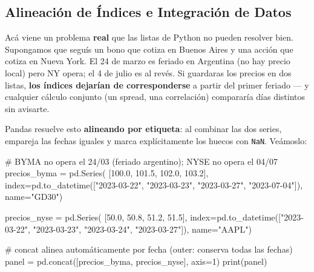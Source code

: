 \documentclass[
  spanish,
  letterpaper,
  DIV=11,
  numbers=noendperiod]{scrreprt}
\newenvironment{Shaded}{\begin{snugshade}}{\end{snugshade}}
\newcommand{\BuiltInTok}[1]{\textcolor[rgb]{0.00,0.23,0.31}{#1}}
\newcommand{\CommentTok}[1]{\textcolor[rgb]{0.37,0.37,0.37}{#1}}
\newcommand{\DecValTok}[1]{\textcolor[rgb]{0.68,0.00,0.00}{#1}}
\newcommand{\FloatTok}[1]{\textcolor[rgb]{0.68,0.00,0.00}{#1}}
\newcommand{\NormalTok}[1]{\textcolor[rgb]{0.00,0.23,0.31}{#1}}
\newcommand{\OperatorTok}[1]{\textcolor[rgb]{0.37,0.37,0.37}{#1}}
\newcommand{\StringTok}[1]{\textcolor[rgb]{0.13,0.47,0.30}{#1}}
\begin{document}
\subsection{Alineación de Índices e Integración de
Datos}\label{alineaciuxf3n-de-uxedndices-e-integraciuxf3n-de-datos}

Acá viene un problema \textbf{real} que las listas de Python no pueden
resolver bien. Supongamos que seguís un bono que cotiza en Buenos Aires
y una acción que cotiza en Nueva York. El 24 de marzo es feriado en
Argentina (no hay precio local) pero NY opera; el 4 de julio es al
revés. Si guardaras los precios en dos listas, \textbf{los índices
dejarían de corresponderse} a partir del primer feriado --- y cualquier
cálculo conjunto (un spread, una correlación) compararía días distintos
sin avisarte.

Pandas resuelve esto \textbf{alineando por etiqueta}: al combinar las
dos series, empareja las fechas iguales y marca explícitamente los
huecos con \texttt{NaN}. Veámoslo:

\label{alineacion-fechas}
\begin{Shaded}
\begin{Highlighting}[]
\CommentTok{\# BYMA no opera el 24/03 (feriado argentino); NYSE no opera el 04/07}
\NormalTok{precios\_byma }\OperatorTok{=}\NormalTok{ pd.Series(}
\NormalTok{    [}\FloatTok{100.0}\NormalTok{, }\FloatTok{101.5}\NormalTok{, }\FloatTok{102.0}\NormalTok{, }\FloatTok{103.2}\NormalTok{],}
\NormalTok{    index}\OperatorTok{=}\NormalTok{pd.to\_datetime([}\StringTok{"2023{-}03{-}22"}\NormalTok{, }\StringTok{"2023{-}03{-}23"}\NormalTok{, }\StringTok{"2023{-}03{-}27"}\NormalTok{, }\StringTok{"2023{-}07{-}04"}\NormalTok{]),}
\NormalTok{    name}\OperatorTok{=}\StringTok{"GD30"}\NormalTok{)}

\NormalTok{precios\_nyse }\OperatorTok{=}\NormalTok{ pd.Series(}
\NormalTok{    [}\FloatTok{50.0}\NormalTok{, }\FloatTok{50.8}\NormalTok{, }\FloatTok{51.2}\NormalTok{, }\FloatTok{51.5}\NormalTok{],}
\NormalTok{    index}\OperatorTok{=}\NormalTok{pd.to\_datetime([}\StringTok{"2023{-}03{-}22"}\NormalTok{, }\StringTok{"2023{-}03{-}23"}\NormalTok{, }\StringTok{"2023{-}03{-}24"}\NormalTok{, }\StringTok{"2023{-}03{-}27"}\NormalTok{]),}
\NormalTok{    name}\OperatorTok{=}\StringTok{"AAPL"}\NormalTok{)}

\CommentTok{\# concat alinea automáticamente por fecha (outer: conserva todas las fechas)}
\NormalTok{panel }\OperatorTok{=}\NormalTok{ pd.concat([precios\_byma, precios\_nyse], axis}\OperatorTok{=}\DecValTok{1}\NormalTok{)}
\BuiltInTok{print}\NormalTok{(panel)}
\end{Highlighting}
\end{Shaded}
\end{document}
